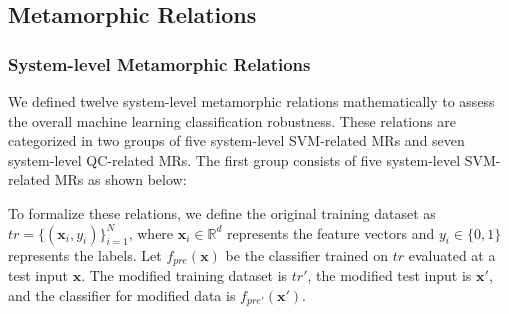 \documentclass[12pt,a4paper]{article}
\begin{document}
	\subsection{Metamorphic Relations}
	
	\subsubsection{System-level Metamorphic Relations}
	\label{sec:sys_mrs}
	
	We defined twelve system-level metamorphic relations mathematically to assess the overall machine learning classification robustness. These relations are categorized in two groups of five system-level SVM-related MRs and seven system-level QC-related MRs. The first group consists of five system-level SVM-related MRs as shown below:

		To formalize these relations, we define the original training dataset as $tr = \{(\mathbf{x}_i, y_i)\}_{i=1}^N$, where $\mathbf{x}_i \in \mathbb{R}^d$ represents the feature vectors and $y_i \in \{0, 1\}$ represents the labels. Let $f_{pre}(\mathbf{x})$ be the classifier trained on $tr$ evaluated at a test input $\mathbf{x}$. The modified training dataset is $tr'$, the modified test input is $\mathbf{x}'$, and the classifier for modified data is $f_{pre'}(\mathbf{x}')$.
		
\end{document}
